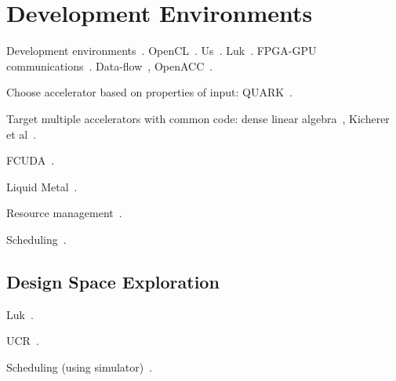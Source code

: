 \section{Development Environments}
\label{sec:dev}

Development environments~\cite{mlk12}.
OpenCL~\cite{Ahmed11}.
Us~\cite{blc17,cft+10,ctg+07,ftb+06,wcc12,wcc13}.
Luk~\cite{ttpl11}.
FPGA-GPU communications~\cite{brf14,tdm13,tdmp15}.
Data-flow~\cite{szb+12},
OpenACC~\cite{lkv16}.

Choose accelerator based on properties of input:
QUARK~\cite{hcy+14,hjl+15}.

Target multiple accelerators with common code:
dense linear algebra~\cite{daa+15},
Kicherer et al~\cite{knbk12}.

FCUDA~\cite{pgs+13}.

Liquid Metal~\cite{abb+12}.

Resource management~\cite{bdm+13}.

Scheduling~\cite{lk17,lp17}.

\subsection{Design Space Exploration}

Luk~\cite{ll12,ll11,slkk13}.

UCR~\cite{bbg13}.

Scheduling (using simulator)~\cite{blby11}.
